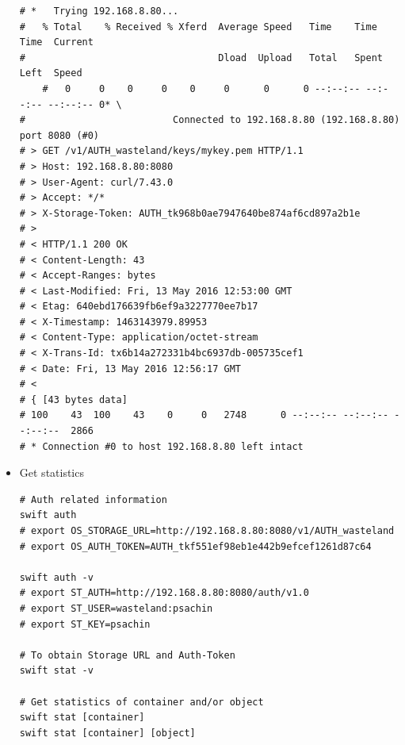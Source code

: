 \documentclass{article}
\begin{document}
\begin{itemize}
\begin{verbatim}
# *   Trying 192.168.8.80...
#   % Total    % Received % Xferd  Average Speed   Time    Time     Time  Current
#                                  Dload  Upload   Total   Spent    Left  Speed
	#   0     0    0     0    0     0      0      0 --:--:-- --:--:-- --:--:-- 0* \
#                          Connected to 192.168.8.80 (192.168.8.80) port 8080 (#0)
# > GET /v1/AUTH_wasteland/keys/mykey.pem HTTP/1.1
# > Host: 192.168.8.80:8080
# > User-Agent: curl/7.43.0
# > Accept: */*
# > X-Storage-Token: AUTH_tk968b0ae7947640be874af6cd897a2b1e
# >
# < HTTP/1.1 200 OK
# < Content-Length: 43
# < Accept-Ranges: bytes
# < Last-Modified: Fri, 13 May 2016 12:53:00 GMT
# < Etag: 640ebd176639fb6ef9a3227770ee7b17
# < X-Timestamp: 1463143979.89953
# < Content-Type: application/octet-stream
# < X-Trans-Id: tx6b14a272331b4bc6937db-005735cef1
# < Date: Fri, 13 May 2016 12:56:17 GMT
# <
# { [43 bytes data]
# 100    43  100    43    0     0   2748      0 --:--:-- --:--:-- --:--:--  2866
# * Connection #0 to host 192.168.8.80 left intact
\end{verbatim}

\item Get statistics
\begin{verbatim}
# Auth related information
swift auth
# export OS_STORAGE_URL=http://192.168.8.80:8080/v1/AUTH_wasteland
# export OS_AUTH_TOKEN=AUTH_tkf551ef98eb1e442b9efcef1261d87c64

swift auth -v
# export ST_AUTH=http://192.168.8.80:8080/auth/v1.0
# export ST_USER=wasteland:psachin
# export ST_KEY=psachin

# To obtain Storage URL and Auth-Token
swift stat -v

# Get statistics of container and/or object
swift stat [container]
swift stat [container] [object]


\end{verbatim}
\end{itemize}
\end{document}
